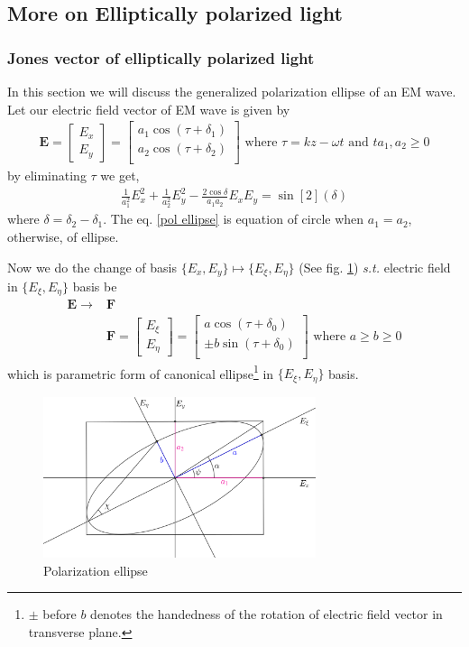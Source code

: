 \documentclass[11pt,a4paper]{article}
\numberwithin{equation}{section}
\begin{document}
\subsection{More on Elliptically polarized light}
\subsubsection{Jones vector of elliptically polarized light}
In this section we will discuss the generalized polarization ellipse of an EM wave. Let our electric field vector of EM wave is given by
\begin{align}
	\boldsymbol{E} =
	\begin{bmatrix}
		E_x\\E_y
	\end{bmatrix}=
	\begin{bmatrix}
		a_1 \cos(\tau+\delta_1)\\
		a_2 \cos(\tau+\delta_2)\\
	\end{bmatrix}
	\text{ where }
	\tau = kz-\omega t\text{ and } t a_1,a_2\ge0
\end{align}
by eliminating $\tau$ we get,
\begin{align}
	\frac{1}{a_1^2}E_x^2 +\frac{1}{a_2^2}E_y^2 -\frac{2\cos\delta}{a_1 a_2} E_x E_y = \sin[2](\delta)
	\label{pol ellipse}
\end{align}
where $\delta = \delta_2-\delta_1$.
The eq. \ref{pol ellipse} is equation of circle when $a_1 = a_2$, otherwise, of ellipse. \cite{born-wolf}

Now we do the change of basis $\{E_x,E_y\}\longmapsto\{E_\xi,E_\eta\}$ (See fig. \ref{fig:pol ellipse}) \textit{s.t.} electric field in $\{E_\xi,E_\eta\}$ basis be
\begin{align}
	\boldsymbol{E}\rightarrow&\boldsymbol{F}\nonumber\\
	&\boldsymbol{F} =
	\begin{bmatrix}
		E_\xi\\E_\eta
	\end{bmatrix}=
	\begin{bmatrix}
		a \cos(\tau+\delta_0)\\
		\pm b \sin(\tau+\delta_0)\\
	\end{bmatrix} \text{ where } a\ge b\ge 0
\end{align}
which is parametric form of canonical ellipse\footnote{$\pm$ before $b$ denotes the handedness of the rotation of electric field vector in transverse plane.} in $\{E_\xi,E_\eta\}$ basis.
\begin{figure}[H]
	\centering
	\includegraphics[width=8cm]{ellipse.png}
	\caption{Polarization ellipse}
	\label{fig:pol ellipse}
\end{figure}
\end{document}
